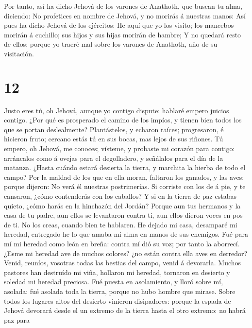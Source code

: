  Por tanto, así ha dicho Jehová de los varones de Anathoth,
que buscan tu alma, diciendo: No profetices en nombre de Jehová, y no
morirás á nuestras manos:  Así pues ha dicho Jehová de los
ejércitos: He aquí que yo los visito; los mancebos morirán á cuchillo;
sus hijos y sus hijas morirán de hambre;  Y no quedará
resto de ellos: porque yo traeré mal sobre los varones de Anathoth, año
de su visitación.

\hypertarget{section-11}{%
\section{12}\label{section-11}}

 Justo eres tú, oh Jehová, aunque yo contigo dispute:
hablaré empero juicios contigo. ¿Por qué es prosperado el camino de los
impíos, y tienen bien todos los que se portan deslealmente? 
Plantástelos, y echaron raíces; progresaron, é hicieron fruto; cercano
estás tú en sus bocas, mas lejos de sus riñones.  Tú empero,
oh Jehová, me conoces; vísteme, y probaste mi corazón para contigo:
arráncalos como á ovejas para el degolladero, y señálalos para el día de
la matanza.  ¿Hasta cuándo estará desierta la tierra, y
marchita la hierba de todo el campo? Por la maldad de los que en ella
moran, faltaron los ganados, y las aves; porque dijeron: No verá él
nuestras postrimerías.  Si corriste con los de á pie, y te
cansaron, ¿cómo contenderás con los caballos? Y si en la tierra de paz
estabas quieto, ¿cómo harás en la hinchazón del Jordán? 
Porque aun tus hermanos y la casa de tu padre, aun ellos se levantaron
contra ti, aun ellos dieron voces en pos de ti. No los creas, cuando
bien te hablaren.  He dejado mi casa, desamparé mi heredad,
entregado he lo que amaba mi alma en manos de sus enemigos. 
Fué para mí mi heredad como león en breña: contra mí dió su voz; por
tanto la aborrecí.  ¿Esme mi heredad ave de muchos colores?
¿no están contra ella aves en derredor? Venid, reuníos, vosotras todas
las bestias del campo, venid á devorarla.  Muchos pastores
han destruído mi viña, hollaron mi heredad, tornaron en desierto y
soledad mi heredad preciosa.  Fué puesta en asolamiento, y
lloró sobre mí, asolada: fué asolada toda la tierra, porque no hubo
hombre que mirase.  Sobre todos los lugares altos del
desierto vinieron disipadores: porque la espada de Jehová devorará desde
el un extremo de la tierra hasta el otro extremo: no habrá paz para

